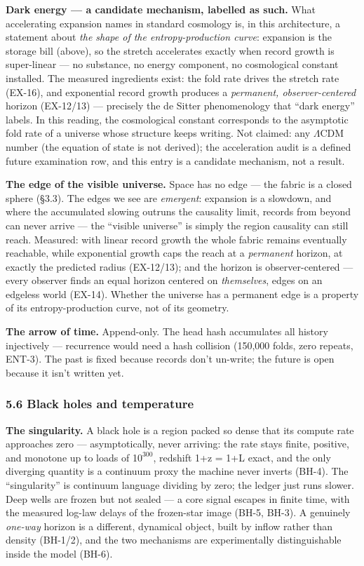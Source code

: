 \documentclass[
  11pt,
]{article}
\begin{document}
\textbf{Dark energy --- a candidate mechanism, labelled as such.} What
accelerating expansion names in standard cosmology is, in this
architecture, a statement about \emph{the shape of the
entropy-production curve}: expansion is the storage bill (above), so the
stretch accelerates exactly when record growth is super-linear --- no
substance, no energy component, no cosmological constant installed. The
measured ingredients exist: the fold rate drives the stretch rate
(EX-16), and exponential record growth produces a \emph{permanent,
observer-centered} horizon (EX-12/13) --- precisely the de Sitter
phenomenology that ``dark energy'' labels. In this reading, the
cosmological constant corresponds to the asymptotic fold rate of a
universe whose structure keeps writing. Not claimed: any $\Lambda$CDM number
(the equation of state is not derived); the acceleration audit is a
defined future examination row, and this entry is a candidate mechanism,
not a result.

\textbf{The edge of the visible universe.} Space has no edge --- the
fabric is a closed sphere (\S{}3.3). The edges we see are \emph{emergent}:
expansion is a slowdown, and where the accumulated slowing outruns the
causality limit, records from beyond can never arrive --- the ``visible
universe'' is simply the region causality can still reach. Measured:
with linear record growth the whole fabric remains eventually reachable,
while exponential growth caps the reach at a \emph{permanent} horizon,
at exactly the predicted radius (EX-12/13); and the horizon is
observer-centered --- every observer finds an equal horizon centered on
\emph{themselves}, edges on an edgeless world (EX-14). Whether the
universe has a permanent edge is a property of its entropy-production
curve, not of its geometry.

\textbf{The arrow of time.} Append-only. The head hash accumulates all
history injectively --- recurrence would need a hash collision (150,000
folds, zero repeats, ENT-3). The past is fixed because records don't
un-write; the future is open because it isn't written yet.

\subsubsection{5.6 Black holes and
temperature}\label{black-holes-and-temperature}

\textbf{The singularity.} A black hole is a region packed so dense that
its compute rate approaches zero --- asymptotically, never arriving: the
rate stays finite, positive, and monotone up to loads of 1$0^{300}$, redshift
1+z = 1+L exact, and the only diverging quantity is a continuum proxy
the machine never inverts (BH-4). The ``singularity'' is continuum
language dividing by zero; the ledger just runs slower. Deep wells are
frozen but not sealed --- a core signal escapes in finite time, with the
measured log-law delays of the frozen-star image (BH-5, BH-3). A
genuinely \emph{one-way} horizon is a different, dynamical object, built
by inflow rather than density (BH-1/2), and the two mechanisms are
experimentally distinguishable inside the model (BH-6).
\end{document}

